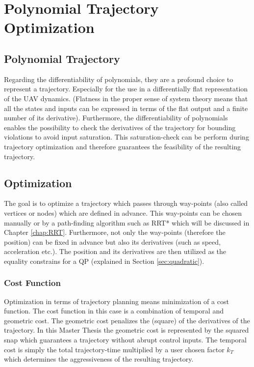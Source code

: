 \chapter{Polynomial Trajectory Optimization}\label{sec:trajectory}


\section{Polynomial Trajectory}\label{sec:polynomial}

Regarding the differentiability of polynomials, they are a profound choice to represent a trajectory. Especially for the use in a differentially flat representation of the UAV dynamics. (Flatness in the proper sense of system theory means that all the states and inputs can be expressed in terms of the flat output and a finite number of its derivative). \newline
Furthermore, the differentiability of polynomials enables the possibility to check the derivatives of the trajectory for bounding violations to avoid input saturation. This saturation-check can be perform during trajectory optimization and therefore guarantees the feasibility of the resulting trajectory.

\section{Optimization}\label{sec:optimization}

The goal is to optimize a trajectory which passes through way-points (also called vertices or nodes) which are defined in advance. This way-points can be chosen manually or by a path-finding algorithm such as RRT* which will be discussed in Chapter \ref{chap:RRT}.
Furthermore, not only the way-points (therefore the position) can be fixed in advance but also its derivatives (such as speed, acceleration etc.). The position and its derivatives are then utilized as the equality constrains for a QP (explained in Section \ref{sec:quadratic}).

\subsection{Cost Function}\label{sec:cost}

Optimization in terms of trajectory planning means minimization of a cost function. The cost function in this case is a combination of temporal and geometric cost. The geometric cost penalizes the (square) of the derivatives of the trajectory. In this Master Thesis the geometric cost is represented by the squared snap which guarantees a trajectory without abrupt  control inputs. \newline
The temporal cost is simply the total trajectory-time multiplied by a user chosen factor $k_T$ which determines the aggressiveness of the resulting trajectory. \newline

